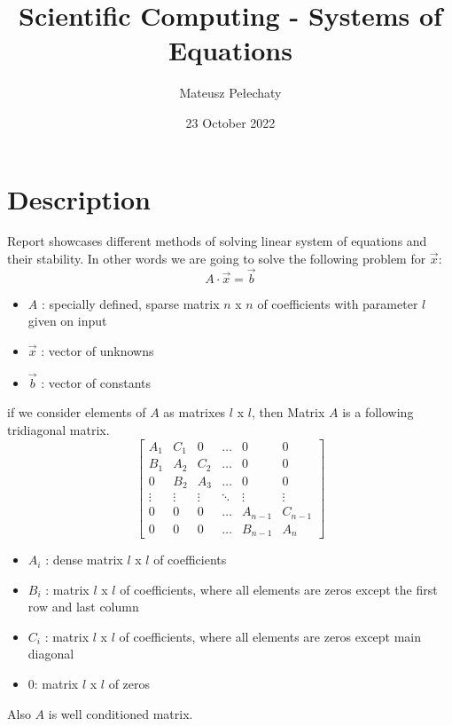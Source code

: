 \documentclass[11pt]{article}
\title{Scientific Computing - Systems of Equations}
\author{Mateusz Pełechaty}
\date{23 October 2022}%
\begin{document}
\maketitle

\section{Description}
Report showcases different methods of solving linear system of equations and their stability.
In other words we are going to solve the following problem for $\vec{x}$:
$$
    A \cdot \vec{x} = \vec{b}
$$
\begin{itemize}
    \item $A$ : specially defined, sparse matrix $n$ x $n$ of coefficients with parameter $l$ given on input
    \item $\vec{x}$ : vector of unknowns
    \item $\vec{b}$ : vector of constants
\end{itemize}
if we consider elements of $A$ as matrixes $l$ x $l$, then Matrix $A$ is a following tridiagonal matrix.
$$
    \begin{bmatrix}
        A_{1} & C_{1} & 0 & \dots & 0 & 0 \\
        B_{1} & A_{2} & C_{2} & \dots & 0 & 0 \\
        0 & B_{2} & A_{3} & \dots & 0 & 0 \\
        \vdots & \vdots & \vdots & \ddots & \vdots & \vdots \\
        0 & 0 & 0 & \dots & A_{n-1} & C_{n-1} \\
        0 & 0 & 0 & \dots & B_{n-1} & A_{n}
    \end{bmatrix}
$$
\begin{itemize}
    \item $A_{i}$ : dense matrix $l$ x $l$ of coefficients
    \item $B_{i}$ : matrix $l$ x $l$ of coefficients, where all elements are zeros except the first row and last column
    \item $C_{i}$ : matrix $l$ x $l$ of coefficients, where all elements are zeros except main diagonal
    \item 0: matrix $l$ x $l$ of zeros
\end{itemize}
Also $A$ is well conditioned matrix.
\end{document}
